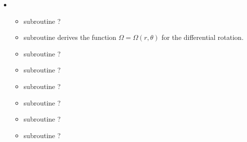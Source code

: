 \documentclass[letterpaper,10pt,english]{sphinxmanual}
\begin{document}
\begin{itemize}
\begin{itemize}
\item {} 
\sphinxAtStartPar
subroutine  \sphinxhyphen{} solves the equations \(\Phi _\mathrm{a} \big |_{S _\mathrm{NS}} = \Sigma _l Y(\theta) (a_l r^l) |_{S _\mathrm{NS}}\) (inside the star) and \(\Phi _\mathrm{a} \big |_{S _\mathrm{NS}} = \Sigma _l Y(\theta) (b_l r^{-(l+1)}) |_{S _\mathrm{NS}}\) (outside the star), where \(S _\mathrm{NS}\) is stellar surface and \(\Phi _\mathrm{a} \big |_{S _\mathrm{NS}} = (\Phi + \Omega \Psi + C) |_{S _\mathrm{NS}}\). Each system of equations is solved with a LU decomposition and a subsequent backward substitution adopting the routines provided in the Numerical Recipes (ludcmp and
lubksb). Notice that, in order to avoid spurious effects, the surface terms are evaluated on top
of the super\sphinxhyphen{}ellipsoid that best fit the numerical surface.


\end{itemize}

\item {} 
\sphinxAtStartPar
{}
\begin{itemize}
\item {} 
\sphinxAtStartPar
subroutine  \sphinxhyphen{} ?

\item {} 
\sphinxAtStartPar
subroutine  \sphinxhyphen{} derives the function \(\Omega = \Omega (r,\theta)\) for the differential rotation.

\item {} 
\sphinxAtStartPar
subroutine  \sphinxhyphen{} ?

\item {} 
\sphinxAtStartPar
subroutine  \sphinxhyphen{} ?

\item {} 
\sphinxAtStartPar
subroutine  \sphinxhyphen{} ?

\item {} 
\sphinxAtStartPar
subroutine  \sphinxhyphen{} ?

\item {} 
\sphinxAtStartPar
subroutine  \sphinxhyphen{} ?

\item {} 
\sphinxAtStartPar
subroutine  \sphinxhyphen{} ?


\end{itemize}


\end{itemize}
\end{document}
